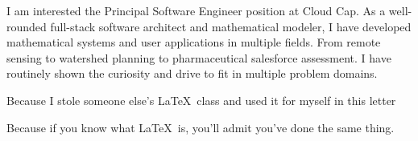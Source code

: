 \documentclass[11pt, letterpaper]{awesome-cv}
\begin{document}
\begin{cvletter}

I am interested the Principal Software Engineer position at Cloud Cap. As a well-rounded full-stack software architect and mathematical modeler, I have developed mathematical systems and user applications in multiple fields. From remote sensing to watershed planning to pharmaceutical salesforce assessment. I have routinely shown the curiosity and drive to fit in multiple problem domains. 


Because I stole someone else's \LaTeX\ class and used it for myself in this letter


Because if you know what \LaTeX\ is, you'll admit you've done the same thing.

\end{cvletter}


\makeletterclosing
\end{document}

